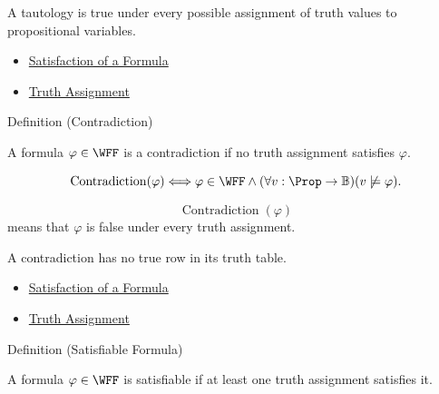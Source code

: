 \begin{remark*}[Interpretation]
A tautology is true under every possible assignment of truth values to propositional variables.
\end{remark*}

\begin{dependencies}
\begin{itemize}
  \item \hyperref[def:satisfaction-propositional-formula]{Satisfaction of a Formula}
  \item \hyperref[def:truth-assignment-propositional-logic]{Truth Assignment}
\end{itemize}
\end{dependencies}
\begin{definitionbox}{Definition (Contradiction)}
\begin{definition}[Contradiction]
\label{def:contradiction-propositional-logic}
A formula \(\varphi\in\WFF\) is a contradiction if no truth assignment satisfies \(\varphi\).
\end{definition}
\end{definitionbox}

\begin{remark*}
\[
\operatorname{Contradiction}(\varphi)
\Longleftrightarrow
\varphi\in\WFF
\land
(\forall v:\Prop\to\mathbb{B})(v\not\models\varphi).
\]
\end{remark*}

\begin{remark*}
\[
\operatorname{Contradiction}(\varphi)
\]
means that \(\varphi\) is false under every truth assignment.
\end{remark*}

\begin{remark*}[Interpretation]
A contradiction has no true row in its truth table.
\end{remark*}

\begin{dependencies}
\begin{itemize}
  \item \hyperref[def:satisfaction-propositional-formula]{Satisfaction of a Formula}
  \item \hyperref[def:truth-assignment-propositional-logic]{Truth Assignment}
\end{itemize}
\end{dependencies}
\begin{definitionbox}{Definition (Satisfiable Formula)}
\begin{definition}
\label{def:satisfiable-formula-propositional-logic}
A formula \(\varphi\in\WFF\) is satisfiable if at least one truth assignment satisfies it.
\end{definition}
\end{definitionbox}

